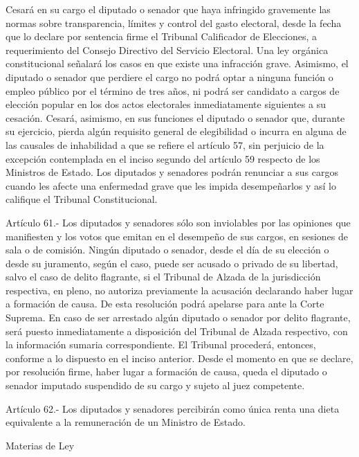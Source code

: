     Cesará en su cargo el diputado o senador que haya infringido gravemente las normas sobre transparencia, límites y control del gasto electoral, desde la fecha que lo declare por sentencia firme el Tribunal Calificador de Elecciones, a requerimiento del Consejo Directivo del Servicio Electoral. Una ley orgánica constitucional señalará los casos en que existe una infracción grave. Asimismo, el diputado o senador que perdiere el cargo no podrá optar a ninguna función o empleo público por el término de tres años, ni podrá ser candidato a cargos de elección popular en los dos actos electorales inmediatamente siguientes a su cesación.
    Cesará, asimismo, en sus funciones el diputado o senador que, durante su ejercicio, pierda algún requisito general de elegibilidad o incurra en alguna de las causales de inhabilidad a que se refiere el artículo 57, sin perjuicio de la excepción contemplada en el inciso segundo del artículo 59 respecto de los Ministros de Estado.
    Los diputados y senadores podrán renunciar a sus cargos cuando les afecte una enfermedad grave que les impida desempeñarlos y así lo califique el Tribunal Constitucional.


    Artículo 61.- Los diputados y senadores sólo son inviolables por las opiniones que manifiesten y los votos que emitan en el desempeño de sus cargos, en sesiones de sala o de comisión.
    Ningún diputado o senador, desde el día de su elección o desde su juramento, según el caso, puede ser acusado o privado de su libertad, salvo el caso de delito flagrante, si el Tribunal de Alzada de la jurisdicción respectiva, en pleno, no autoriza previamente la acusación declarando haber lugar a formación de causa. De esta resolución podrá apelarse para ante la Corte Suprema.
    En caso de ser arrestado algún diputado o senador por delito flagrante, será puesto inmediatamente a disposición del Tribunal de Alzada respectivo, con la información sumaria correspondiente. El Tribunal procederá, entonces, conforme a lo dispuesto en el inciso anterior.
    Desde el momento en que se declare, por resolución firme, haber lugar a formación de causa, queda el diputado o senador imputado suspendido de su cargo y sujeto al juez competente.




    Artículo 62.- Los diputados y senadores percibirán como única renta una dieta equivalente a la remuneración de un Ministro de Estado.




    Materias de Ley



